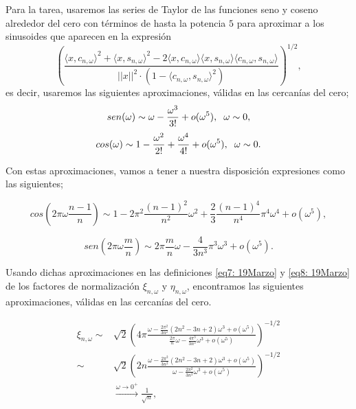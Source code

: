 Para la tarea, usaremos las series de Taylor
de las funciones seno y coseno alrededor del cero
con términos de hasta la potencia $5$ para aproximar
a los sinusoides que aparecen en la expresión 
\begin{equation}
\label{eq1: 22May}
\left(		  
		  \frac{\langle x, c_{n, \omega } \rangle^{2} +  \langle x, s_{n, \omega } \rangle^{2}	
	       -2  \langle x, c_{n, \omega } \rangle \langle x, s_{n, \omega } \rangle \langle c_{n, \omega }, s_{n, \omega } \rangle}{ || x ||^{2} \cdot
	       (1- \langle c_{n, \omega }, s_{n, \omega } \rangle^{2})}	  
\right) ^{1/2},
\end{equation}
es decir, usaremos
las siguientes aproximaciones, válidas en las cercanías
del cero;
\[
sen(\omega) 
\sim
\omega - \frac{\omega^{3}}{3!}
+ o(\omega^{5}),
\hspace{0.2cm} \omega \sim 0,
\]
\[
cos(\omega) \sim 1 - \frac{\omega^{2}}{2!}
+ \frac{\omega^{4}}{4!} + o(\omega^{5}),
\hspace{0.2cm} \omega \sim 0.
\]

Con estas aproximaciones, vamos a tener
a nuestra disposición expresiones como las siguientes;

\[
cos\left(
2 \pi \omega \frac{n-1}{n}\right) \sim
1-2\pi^{2}\frac{(n-1)^{2}}{n^{2}} \omega^{2}
+\frac{2}{3} \frac{(n-1)^{4}}{n^{4}} \pi^{4} \omega^{4}
+ o(\omega^{5}),
\]

\[
sen\left(
2 \pi \omega \frac{m}{n}\right) \sim
2 \pi \frac{m}{n} \omega 
- \frac{4}{3n^{3}}\pi^{3} \omega^{3}
+ o(\omega^{5}).
\]

Usando dichas aproximaciones en 
las definiciones
\eqref{eq7: 19Marzo} y \eqref{eq8: 19Marzo}
de los factores de normalización
$\xi_{n, \omega}$ y $\eta_{n, \omega}$,
encontramos las siguientes aproximaciones,
válidas en las cercanías del cero.
 
\begin{align*}
\xi_{n, \omega} \sim &
\sqrt{2} 
\left(
4 \pi
\frac{                                                                                                                                          
\omega - \frac{2\pi^{2}}{3n^{2}}(2n^2-3n+2)\omega^{3} + o(\omega^{5})
}{
\frac{2\pi}{n} \omega -
\frac{4 \pi^{3}}{3 n^{3}} \omega^{3} + o(\omega^{5})
}
\right)^{-1/2} \\
\sim &
\sqrt{2} 
\left(
2n
\frac{                                                                                                                                          
\omega - \frac{2\pi^{2}}{3n^{2}}(2n^2-3n+2)\omega^{3} + o(\omega^{5})
}{
\omega -
\frac{2 \pi^{2}}{3 n^{2}} \omega^{3} + o(\omega^{5})
}
\right)^{-1/2} \\ &
\xrightarrow{\omega \rightarrow 0^{+}} 
\frac{1}{\sqrt{n}},
\end{align*}

